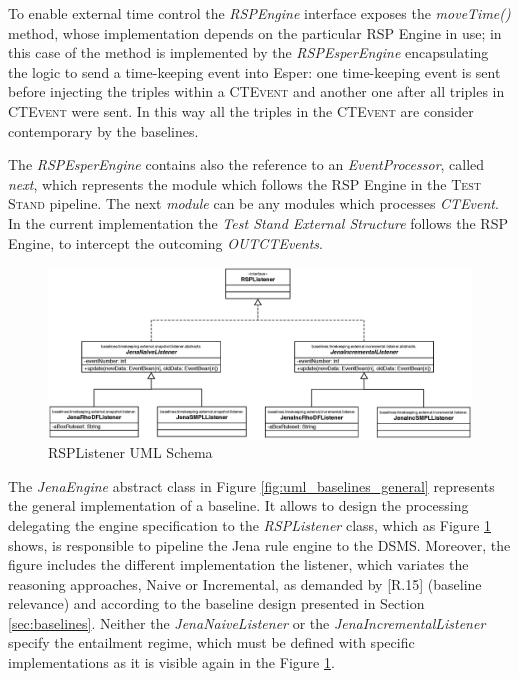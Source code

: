 To enable external time control the \textit{RSPEngine} interface exposes the \textit{moveTime()} method, whose implementation depends on the particular RSP Engine in use; in this case of the method is implemented by the \textit{RSPEsperEngine} encapsulating the logic to send a time-keeping event into Esper: one time-keeping event is sent before injecting the triples within a \textsc{CTEvent} and another one after all triples in \textsc{CTEvent} were sent. In this way all the triples in the \textsc{CTEvent} are consider contemporary by the baselines. 

The \textit{RSPEsperEngine} contains also the reference to an \textit{EventProcessor}, called \textit{next}, which represents the module which follows the RSP Engine in the \textsc{Test Stand} pipeline. The next \textit{module} can be any modules which processes \textit{CTEvent}. In the current implementation the \textit{Test Stand External Structure } follows the RSP Engine, to intercept the outcoming \textit{OUTCTEvents}.

\begin{figure}[tbh]
  \centering
	\includegraphics[width=\linewidth]{images/uml_baselines_listener}
	\caption{RSPListener UML Schema} 
  	\label{fig:uml_baselines_listener}
\end{figure}

The \textit{JenaEngine} abstract class in Figure \ref{fig:uml_baselines_general} represents the general implementation of a baseline. It allows to design the processing delegating the engine specification to  the \textit{RSPListener} class, which as  Figure \ref{fig:uml_baselines_listener} shows, is responsible to pipeline the Jena rule engine to the DSMS. Moreover, the figure includes the different implementation the listener, which variates the reasoning approaches, Naive or Incremental, as demanded by [R.15] (baseline relevance) and according to the baseline design presented in Section \ref{sec:baselines}. Neither the \textit{JenaNaiveListener} or the \textit{JenaIncrementalListener} specify the entailment regime, which must be defined with specific implementations as it is visible again in the Figure \ref{fig:uml_baselines_listener}.

